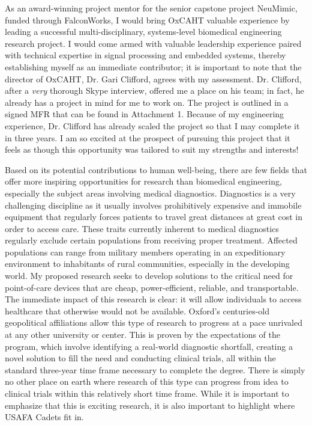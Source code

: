\documentclass{article}
\begin{document}
As an award-winning project mentor for the senior capstone project
NeuMimic, funded through FalconWorks, I would bring OxCAHT valuable experience by leading a
successful multi-disciplinary, systems-level biomedical engineering research project. I would 
come armed with valuable leadership experience paired with technical expertise in signal 
processing and embedded systems, thereby establishing myself as an immediate contributor;
it is important to note that the director of OxCAHT, Dr. Gari Clifford, agrees
with my assessment. Dr. Clifford, after a \emph{very} thorough Skype interview,
offered me a place on his team; in fact, he already has a project in mind for me to work on. 
The project is outlined in a signed MFR that can be found in Attachment 1. 
Because of my engineering experience, Dr. Clifford has already scaled the project so that I may
complete it in three years. I am so excited at the prospect of pursuing this project that it 
feels as though this opportunity was tailored to suit my strengths and interests! 
 
Based on its potential contributions to human well-being, there are few fields
that offer more inspiring opportunities for research than biomedical engineering, especially the subject areas involving medical diagnostics.
Diagnostics is a very challenging discipline as it usually involves
prohibitively expensive and immobile equipment that regularly forces patients
to travel great distances at great cost in order to access care. These traits
currently inherent to medical diagnostics regularly exclude certain
populations from receiving proper
treatment. Affected populations can range from military members operating in an
expeditionary environment to inhabitants of rural communities, especially in the developing
world. My proposed research seeks to develop solutions to the critical need for
point-of-care devices that are cheap, power-efficient, reliable, and
transportable. The immediate impact of this research is clear: it will allow
individuals to access healthcare that otherwise would not be available. Oxford's
centuries-old geopolitical affiliations allow this type of research to progress 
at a pace unrivaled at any other university or center. This is proven by the
expectations of the program, which involve identifying a real-world diagnostic 
shortfall, creating a novel solution to fill the need and conducting
clinical trials, all within the standard three-year time frame necessary to 
complete the degree. There is simply no other place on earth where research of
this type can progress from idea to clinical trials within this relatively short
time frame. While it is important to emphasize that this is exciting research,
it is also important to highlight where USAFA Cadets fit in.
 
\end{document}
